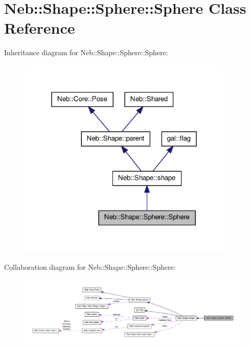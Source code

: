 \hypertarget{classNeb_1_1Shape_1_1Sphere_1_1Sphere}{\section{\-Neb\-:\-:\-Shape\-:\-:\-Sphere\-:\-:\-Sphere \-Class \-Reference}
\label{classNeb_1_1Shape_1_1Sphere_1_1Sphere}
}


\-Inheritance diagram for \-Neb\-:\-:\-Shape\-:\-:\-Sphere\-:\-:\-Sphere\-:\nopagebreak
\begin{figure}[H]
\begin{center}
\leavevmode
\includegraphics[width=292pt]{classNeb_1_1Shape_1_1Sphere_1_1Sphere__inherit__graph}
\end{center}
\end{figure}


\-Collaboration diagram for \-Neb\-:\-:\-Shape\-:\-:\-Sphere\-:\-:\-Sphere\-:\nopagebreak
\begin{figure}[H]
\begin{center}
\leavevmode
\includegraphics[width=350pt]{classNeb_1_1Shape_1_1Sphere_1_1Sphere__coll__graph}
\end{center}
\end{figure}
